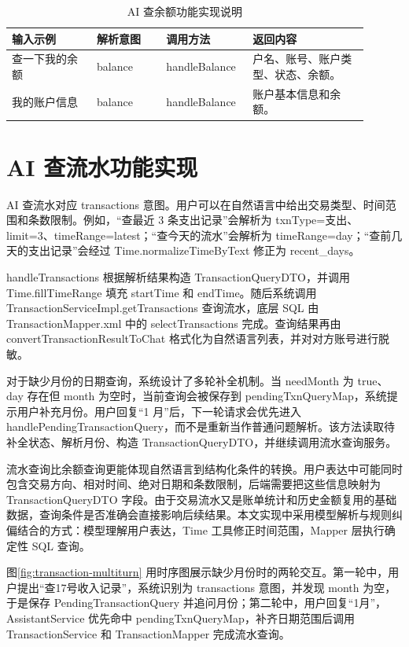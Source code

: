 \documentclass[bachelor, print]{xduthesis}
\begin{document}
\begin{table}[H]
    \centering
    \caption{AI 查余额功能实现说明}
    \label{tab:balance}
    \begin{tabular}{|p{0.22\linewidth}|p{0.18\linewidth}|p{0.2\linewidth}|p{0.3\linewidth}|}
        \hline
        输入示例 & 解析意图 & 调用方法 & 返回内容 \\
        \hline
        查一下我的余额 & balance & handleBalance & 户名、账号、账户类型、状态、余额。 \\
        \hline
        我的账户信息 & balance & handleBalance & 账户基本信息和余额。 \\
        \hline
    \end{tabular}
\end{table}

\section{AI 查流水功能实现}

AI 查流水对应 transactions 意图。用户可以在自然语言中给出交易类型、时间范围和条数限制。例如，“查最近 3 条支出记录”会解析为 txnType=支出、limit=3、timeRange=latest；“查今天的流水”会解析为 timeRange=day；“查前几天的支出记录”会经过 Time.normalizeTimeByText 修正为 recent\_days。

handleTransactions 根据解析结果构造 TransactionQueryDTO，并调用 Time.fillTimeRange 填充 startTime 和 endTime。随后系统调用 TransactionServiceImpl.getTransactions 查询流水，底层 SQL 由 TransactionMapper.xml 中的 selectTransactions 完成。查询结果再由 convertTransactionResultToChat 格式化为自然语言列表，并对对方账号进行脱敏。

对于缺少月份的日期查询，系统设计了多轮补全机制。当 needMonth 为 true、day 存在但 month 为空时，当前查询会被保存到 pendingTxnQueryMap，系统提示用户补充月份。用户回复“1 月”后，下一轮请求会优先进入 handlePendingTransactionQuery，而不是重新当作普通问题解析。该方法读取待补全状态、解析月份、构造 TransactionQueryDTO，并继续调用流水查询服务。

流水查询比余额查询更能体现自然语言到结构化条件的转换。用户表达中可能同时包含交易方向、相对时间、绝对日期和条数限制，后端需要把这些信息映射为 TransactionQueryDTO 字段。由于交易流水又是账单统计和历史金额复用的基础数据，查询条件是否准确会直接影响后续结果。本文实现中采用模型解析与规则纠偏结合的方式：模型理解用户表达，Time 工具修正时间范围，Mapper 层执行确定性 SQL 查询。

图\ref{fig:transaction-multiturn} 用时序图展示缺少月份时的两轮交互。第一轮中，用户提出“查17号收入记录”，系统识别为 transactions 意图，并发现 month 为空，于是保存 PendingTransactionQuery 并追问月份；第二轮中，用户回复“1月”，AssistantService 优先命中 pendingTxnQueryMap，补齐日期范围后调用 TransactionService 和 TransactionMapper 完成流水查询。
\end{document}
